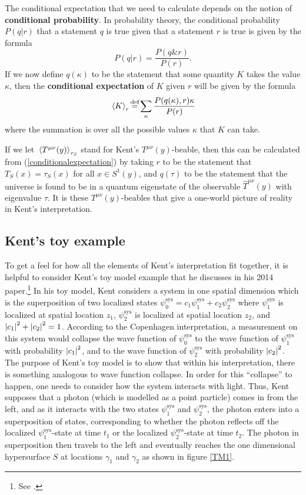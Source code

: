 The conditional expectation that we need to calculate depends on the notion of \textbf{conditional probability}. In probability theory, the conditional probability $P(q|r)$ that a statement $q$ is true given that a statement $r$ is true is given by the formula
\begin{equation} \label{conditionalprobability}
  P(q|r)=\frac{P(q\& r)}{P(r)}. 
\end{equation}
If we now define $q(\kappa)$ to be the statement that some quantity $K$  takes the value $\kappa$, then the  \textbf{conditional expectation} of  $K$ given $r$ will be given by the formula
\begin{equation}\label{conditionalexpectation}
\ev*{K}_r\myeq\sum_\kappa  \frac{P(q(\kappa),r)\kappa}{P(r)}
\end{equation}
where the summation is over all the possible values $\kappa$ that $K$ can take.

If we let $\ev*{T^{\mu\nu}(y)}_{\tau_S}$ stand\label{Kentbeable} for Kent's $T^{\mu\nu}(y)$-beable, then this can be calculated from (\ref{conditionalexpectation}) by taking $r$ to be the statement that 
 $T_S(x)=\tau_S(x)$ for all $x\in S^1(y)$, and $q(\tau)$ to be the statement that the universe is found to be in a quantum eigenstate of the observable $\hat{T}^{\mu\nu}(y)$ with eigenvalue $\tau$. It is these $T^{\mu\nu}(y)$-beables that give a one-world picture of reality in Kent's interpretation.
 
\subsection{Kent's toy example}\label{toysection}
To get a feel for how all the elements of Kent's interpretation fit together, it is helpful to consider Kent's toy model example that he discusses in his 2014 paper.\footnote{See \cite[p.3--4]{Kent2014}.} In his toy model, Kent considers a system in one spatial dimension which is the superposition of two localized states $\psi_0^\text{sys}=c_1 \psi_1^\text{sys}+c_2\psi_2^\text{sys}$ where $\psi_1^\text{sys}$ is localized at spatial location $z_1$, $\psi_2^\text{sys}$ is localized at spatial location $z_2$, and $\abs{c_1}^2+\abs{c_2}^2=1$. According to the Copenhagen interpretation, a measurement on this system would collapse the wave function of $\psi_0^\text{sys}$ to the wave function of $\psi_1^\text{sys}$ with probability $\abs{c_1}^2$, and to the wave function of $\psi_2^\text{sys}$ with probability $\abs{c_2}^2$. The purpose of Kent's toy model is to show that within his interpretation, there is something analogous to wave function collapse.  In order for this ``collapse'' to happen, one needs to consider how the system interacts with light. Thus, Kent supposes that a photon (which is modelled as a point particle) comes in from the left, and as it interacts with the two states $\psi_1^\text{sys}$ and $\psi_2^\text{sys}$, the photon enters into a superposition of states, corresponding to whether the photon reflects off the localized $\psi_1^\text{sys}$-state at time $t_1$ or the localized $\psi_2^\text{sys}$-state at time $t_2$. The photon in superposition then travels to the left and eventually reaches the one dimensional hypersurface $S$ at locations $\gamma_1$ and $\gamma_2$ as shown in figure  \ref{TM1}.

